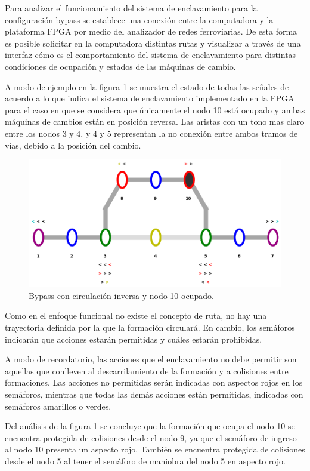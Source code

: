 	Para analizar el funcionamiento del sistema de enclavamiento para la configuración bypass se establece una conexión entre la computadora y la plataforma FPGA por medio del analizador de redes ferroviarias. De esta forma es posible solicitar en la computadora distintas rutas y visualizar a través de una interfaz cómo es el comportamiento del sistema de enclavamiento para distintas condiciones de ocupación y estados de las máquinas de cambio.
	
	A modo de ejemplo en la figura \ref{fig:Bypass_6} se muestra el estado de todas las señales de acuerdo a lo que indica el sistema de enclavamiento implementado en la FPGA para el caso en que se considera que únicamente el nodo 10 está ocupado y ambas máquinas de cambios están en posición reversa. Las aristas con un tono mas claro entre los nodos 3 y 4, y 4 y 5 representan la no conexión entre ambos tramos de vías, debido a la posición del cambio.
	
	\begin{figure}[h]
	\centering
	\includegraphics[scale=0.4]{./Figures/Mapa_B}
		\caption{Bypass con circulación inversa y nodo 10 ocupado.}
		\label{fig:Bypass_6}
	\end{figure}
	
	Como en el enfoque funcional no existe el concepto de ruta, no hay una trayectoria definida por la que la formación circulará. En cambio, los semáforos indicarán que acciones estarán permitidas y cuáles estarán prohibidas. 
	
	A modo de recordatorio, las acciones que el enclavamiento no debe permitir son aquellas que conlleven al descarrilamiento de la formación y a colisiones entre formaciones. Las acciones no permitidas serán indicadas con aspectos rojos en los semáforos, mientras que todas las demás acciones están permitidas, indicadas con semáforos amarillos o verdes.
	
	Del análisis de la figura \ref{fig:Bypass_6} se concluye que la formación que ocupa el nodo 10 se encuentra protegida de colisiones desde el nodo 9, ya que el semáforo de ingreso al nodo 10 presenta un aspecto rojo. También se encuentra protegida de colisiones desde el nodo 5 al tener el semáforo de maniobra del nodo 5 en aspecto rojo.
	
